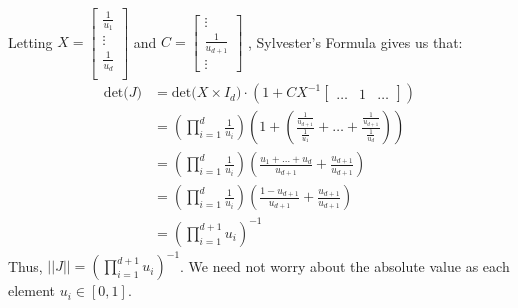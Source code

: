 \documentclass[paper=a4, fontsize=11pt]{scrartcl}
\newcommand{\parens}[1]{ \left( #1 \right) }
\begin{document}
\begin{enumerate}[1.]
\begin{enumerate}[1]
\begin{align*}
        \end{align*}
        Letting $X =  \begin{bmatrix}
                        \frac{1}{u_1} \\
                        \vdots \\
                        \frac{1}{u_d} \\
                      \end{bmatrix}$
        and $C =  \begin{bmatrix}
                    \vdots \\
                    \frac{1}{u_{d+1}} \\
                    \vdots
                  \end{bmatrix}$
        , Sylvester's Formula gives us that:
        \begin{align*}
          \mbox{det(} J \mbox{)}
              &=  \mbox{det(} X\times I_d \mbox{)} \cdot (1 + CX^{-1}\begin{bmatrix} \ldots & 1 & \ldots \end{bmatrix}) \\
              &=  \parens{ \prod_{i = 1}^{d}{\frac{1}{u_{i}}} }
                  \parens{ 1 + \parens{ \frac{\frac{1}{u_{d+1}}}{\frac{1}{u_1}} + \ldots + \frac{\frac{1}{u_{d+1}}}{\frac{1}{u_d}} } } \\
              &=  \parens{ \prod_{i = 1}^{d}{\frac{1}{u_{i}}} }
                  \parens{ \frac{u_1 + \ldots + u_d}{u_{d+1}} + \frac{u_{d+1}}{u_{d+1}} } \\
              &=  \parens{ \prod_{i = 1}^{d}{\frac{1}{u_{i}}} }
                  \parens{ \frac{1 - u_{d+1}}{u_{d+1}} + \frac{u_{d+1}}{u_{d+1}}} \\
              &=  \parens{ \prod_{i = 1}^{d+1}{u_{i}} }^{-1}
        \end{align*}
        Thus, $||J|| = \parens{ \prod_{i = 1}^{d+1}{u_{i}} }^{-1}$. We need not worry about the absolute value as each element $u_i \in [0,1]$. \\


\end{enumerate}
\end{enumerate}
\end{document}

